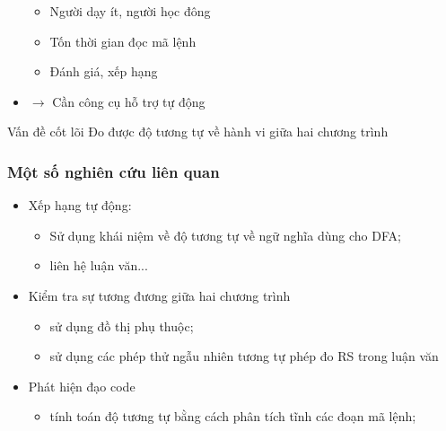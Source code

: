 \documentclass{beamer}
\begin{document}
\begin{frame}
\begin{minipage}{0.59\linewidth}
\begin{itemize}
      \begin{itemize}
      \item Người dạy ít, người học đông
      \item Tốn thời gian đọc mã lệnh
      \item Đánh giá, xếp hạng
      \end{itemize} \pause
    \item $\rightarrow$ Cần công cụ hỗ trợ tự động
    \end{itemize} \pause
  \end{minipage}
  \begin{block}{Vấn đề cốt lõi}
    Đo được độ tương tự về hành vi giữa hai chương trình
  \end{block}
\end{frame}

\begin{frame}
  \frametitle{Một số nghiên cứu liên quan}
  \begin{itemize}
  \item Xếp hạng tự động: \cite{alur2013automated}
    \begin{itemize}
    \item Sử dụng khái niệm về độ tương tự về
      ngữ nghĩa dùng cho DFA; 
      \item liên hệ luận văn...
    \end{itemize}
  \item Kiểm tra sự tương đương giữa hai chương trình
    \begin{itemize}
    \item \cite{bates1993incremental} sử dụng đồ thị phụ thuộc; 
    \item \cite{jiang2009automatic} sử dụng các phép thử ngẫu nhiên
      tương tự phép đo RS trong luận văn
    \end{itemize}
  \item Phát hiện đạo code
    \begin{itemize}
    \item \cite{komondoor2001using} tính toán độ tương tự bằng cách phân tích tĩnh các
      đoạn mã lệnh; 
    \end{itemize}
  \end{itemize}

\end{frame}
\end{document}

